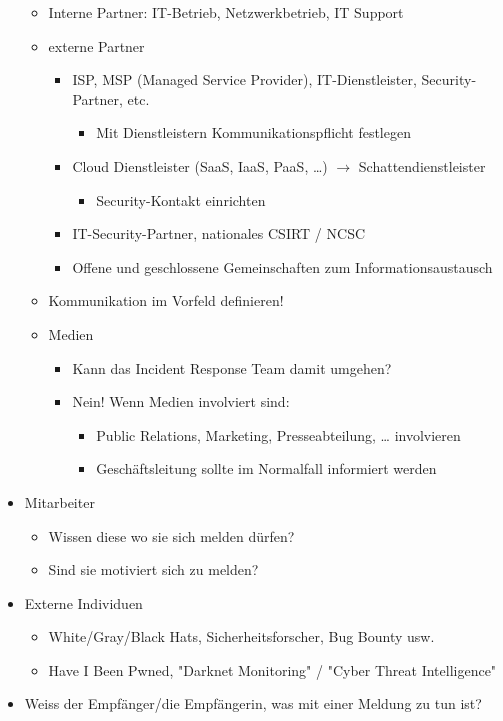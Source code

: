 \begin{itemize}
\begin{itemize}
        \item Interne Partner: IT-Betrieb, Netzwerkbetrieb, IT Support
        \item externe Partner
        \begin{itemize}
            \item ISP, MSP (Managed Service Provider), IT-Dienstleister, Security-Partner, etc.
            \begin{itemize}
                \item Mit Dienstleistern Kommunikationspflicht festlegen
            \end{itemize}
            \item Cloud Dienstleister (SaaS, IaaS, PaaS, …) $\rightarrow$ Schattendienstleister
            \begin{itemize}
                \item Security-Kontakt einrichten
            \end{itemize}
            \item IT-Security-Partner, nationales CSIRT / NCSC
            \item Offene und geschlossene Gemeinschaften zum Informationsaustausch
        \end{itemize}
        \item Kommunikation im Vorfeld definieren!
        \item Medien
        \begin{itemize}
            \item Kann das Incident Response Team damit umgehen?
            \item Nein! Wenn Medien involviert sind:
            \begin{itemize}
                \item Public Relations, Marketing, Presseabteilung, … involvieren
                \item Geschäftsleitung sollte im Normalfall informiert werden
            \end{itemize}
        \end{itemize}
    \end{itemize}
    \item Mitarbeiter
    \begin{itemize}
        \item Wissen diese wo sie sich melden dürfen?
        \item Sind sie motiviert sich zu melden?
    \end{itemize}
    \item Externe Individuen
    \begin{itemize}
        \item White/Gray/Black Hats, Sicherheitsforscher, Bug Bounty usw.
        \item Have I Been Pwned, "Darknet Monitoring" / "Cyber Threat Intelligence"
    \end{itemize}
    \item Weiss der Empfänger/die Empfängerin, was mit einer Meldung zu tun ist?
\end{itemize}

